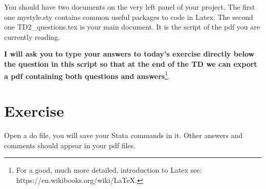 \documentclass[11pt, a4paper]{article} %
\begin{document}
You should have two documents on the very left panel of your project. The first one mystyle.sty contains common useful packages to code in Latex. The second one TD2\_questions.tex is your main document. It is the script of the pdf you are currently reading. 

\textbf{I will ask you to type your answers to today's exercise directly below the question in this script so that at the end of the TD we can export a pdf containing both questions and answers}\footnote{For a good, much more detailed, introduction to Latex see: https://en.wikibooks.org/wiki/LaTeX.}.


\section*{Exercise}

Open a do file, you will save your Stata commands in it. Other answers and comments should appear in your pdf files.
\end{document}

